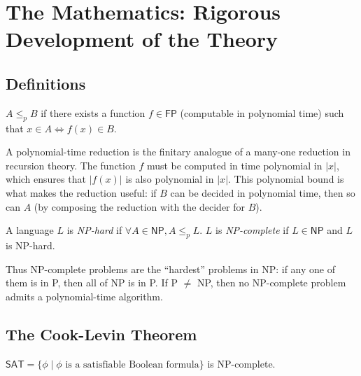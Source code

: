 \section{The Mathematics: Rigorous Development of the Theory}
\label{sec:np:math}

\subsection{Definitions}
\label{sec:np:definitions}

\begin{definition}
$A \le_p B$ if there exists a function $f \in \mathsf{FP}$ (computable in polynomial time) such that $x \in A \iff f(x) \in B$.
\end{definition}

A polynomial-time reduction is the finitary analogue of a many-one reduction in recursion theory. The function $f$ must be computed in time polynomial in $|x|$, which ensures that $|f(x)|$ is also polynomial in $|x|$. This polynomial bound is what makes the reduction useful: if $B$ can be decided in polynomial time, then so can $A$ (by composing the reduction with the decider for $B$).

\begin{definition}
A language $L$ is \emph{NP-hard} if $\forall A \in \mathsf{NP}, A \le_p L$.
$L$ is \emph{NP-complete} if $L \in \mathsf{NP}$ and $L$ is NP-hard.
\end{definition}

Thus NP-complete problems are the ``hardest'' problems in NP: if any one of them is in P, then all of NP is in P. If P $\neq$ NP, then no NP-complete problem admits a polynomial-time algorithm.

\subsection{The Cook-Levin Theorem}
\label{sec:np:cooklevin}

\begin{theorem}
$\mathsf{SAT} = \{ \phi \mid \phi \text{ is a satisfiable Boolean formula} \}$ is NP-complete.
\end{theorem}


